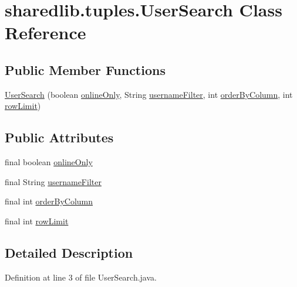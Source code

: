 \hypertarget{classsharedlib_1_1tuples_1_1_user_search}{}\section{sharedlib.\+tuples.\+User\+Search Class Reference}
\label{classsharedlib_1_1tuples_1_1_user_search}
\subsection*{Public Member Functions}
\begin{DoxyCompactItemize}
\item 
\hyperlink{classsharedlib_1_1tuples_1_1_user_search_a0cb2fe1c24c61631c62589299b655c1a}{User\+Search} (boolean \hyperlink{classsharedlib_1_1tuples_1_1_user_search_a49ca772236a9c2d8726d9c119645170c}{online\+Only}, String \hyperlink{classsharedlib_1_1tuples_1_1_user_search_a5680617540c8e1d8901b232717912d65}{username\+Filter}, int \hyperlink{classsharedlib_1_1tuples_1_1_user_search_ad7933aec1eaf9be1189cf31556ab2b4e}{order\+By\+Column}, int \hyperlink{classsharedlib_1_1tuples_1_1_user_search_a70bc74b387d21e5d447e0e8c6c451dc8}{row\+Limit})
\end{DoxyCompactItemize}
\subsection*{Public Attributes}
\begin{DoxyCompactItemize}
\item 
final boolean \hyperlink{classsharedlib_1_1tuples_1_1_user_search_a49ca772236a9c2d8726d9c119645170c}{online\+Only}
\item 
final String \hyperlink{classsharedlib_1_1tuples_1_1_user_search_a5680617540c8e1d8901b232717912d65}{username\+Filter}
\item 
final int \hyperlink{classsharedlib_1_1tuples_1_1_user_search_ad7933aec1eaf9be1189cf31556ab2b4e}{order\+By\+Column}
\item 
final int \hyperlink{classsharedlib_1_1tuples_1_1_user_search_a70bc74b387d21e5d447e0e8c6c451dc8}{row\+Limit}
\end{DoxyCompactItemize}


\subsection{Detailed Description}


Definition at line 3 of file User\+Search.\+java.



